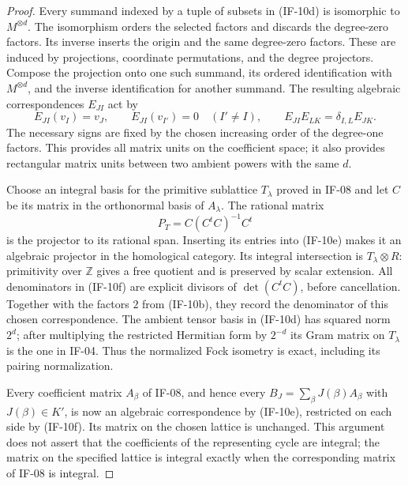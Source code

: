 \documentclass[11pt,a4paper]{article}
\theoremstyle{definition}
\theoremstyle{remark}
\begin{document}
\begin{proof}
Every summand indexed by a tuple of subsets in (IF-10d) is isomorphic
to $M^{\otimes d}$. The isomorphism orders the selected factors and
discards the degree-zero factors. Its inverse inserts the origin and
the same degree-zero factors. These are induced by projections,
coordinate permutations, and the degree projectors. Compose the
projection onto one such summand, its ordered identification with
$M^{\otimes d}$, and the inverse identification for another summand.
The resulting algebraic correspondences $E_{JI}$ act by
\[
 E_{JI}(v_I)=v_J,\qquad E_{JI}(v_{I'})=0\quad(I'\ne I),
 \qquad E_{JI}E_{LK}=\delta_{I,L}E_{JK}.           \tag{IF-10e}
\]
The necessary signs are fixed by the chosen increasing order of the
degree-one factors. This provides all matrix units on the coefficient
space; it also provides rectangular matrix units between two ambient
powers with the same $d$.

Choose an integral basis for the primitive sublattice $T_\lambda$
proved in IF-08 and let $C$ be its matrix in the orthonormal basis of
$A_\lambda$. The rational matrix
\[
 P_T=C(C^tC)^{-1}C^t                              \tag{IF-10f}
\]
is the projector to its rational span. Inserting its entries into
(IF-10e) makes it an algebraic projector in the homological category.
Its integral intersection is $T_\lambda\otimes R$: primitivity over
$\mathbb Z$ gives a free quotient and is preserved by scalar extension.
All denominators in (IF-10f) are explicit divisors of
$\det(C^tC)$, before cancellation. Together with the factors $2$ from
(IF-10b), they record the denominator of this chosen correspondence.
The ambient tensor basis in (IF-10d) has squared norm $2^d$; after
multiplying the restricted Hermitian form by $2^{-d}$ its Gram matrix
on $T_\lambda$ is the one in IF-04. Thus the normalized Fock isometry
is exact, including its pairing normalization.

Every coefficient matrix $A_\beta$ of IF-08, and hence every
$B_J=\sum_\beta J(\beta)A_\beta$ with $J(\beta)\in K'$, is now an
algebraic correspondence by (IF-10e), restricted on each side by
(IF-10f). Its matrix on the chosen lattice is unchanged. This argument
does not assert that the coefficients of the representing cycle are
integral; the matrix on the specified lattice is integral exactly
when the corresponding matrix of IF-08 is integral.


\end{proof}
\end{document}
